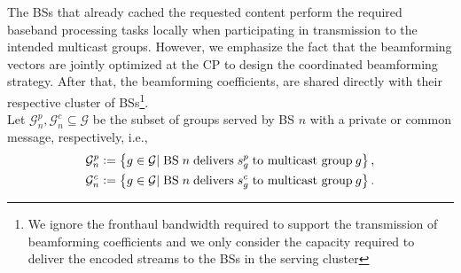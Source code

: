 \documentclass[12pt,draftcls,onecolumn]{IEEEtran}
\newcommand{\defeq}{\vcentcolon=}
\theoremstyle{remark}
\theoremstyle{definition}
\begin{document}
The BSs that already cached the requested content perform the required baseband processing tasks locally when participating in transmission to the intended multicast groups. However, we emphasize the fact that the beamforming vectors are jointly optimized at the CP to design the coordinated beamforming strategy. After that, the beamforming coefficients, are shared directly with their respective cluster of BSs\footnote{We ignore the fronthaul bandwidth required to support the transmission of beamforming coefficients and we only consider the capacity required to deliver the encoded streams to the BSs in the serving cluster}. \\
Let $\mathcal{G}_n^p,\mathcal{G}_n^c \subseteq \mathcal{G}$ be the subset of groups served by BS $n$ with a private or common message, respectively, i.e.,
\begin{align}
\label{eq:e3}
\mathcal{G}_{n}^{p} & \defeq \left\lbrace g \in \mathcal{G}|\hspace{1mm} \text{BS} \hspace{1mm} n \hspace{1mm} \text{delivers} \hspace{1mm} s_{g}^p \hspace{1mm} \text{to multicast group}\hspace{0.8mm} g\right\rbrace,\\
\label{eq:e4}
\mathcal{G}_{n}^{c} & \defeq \left\lbrace g \in \mathcal{G}|\hspace{1mm} \text{BS} \hspace{1mm} n \hspace{1mm} \text{delivers} \hspace{1mm} s_{g}^c \hspace{1mm} \text{to multicast group}\hspace{0.8mm} g\right\rbrace.
\end{align}
\end{document}
